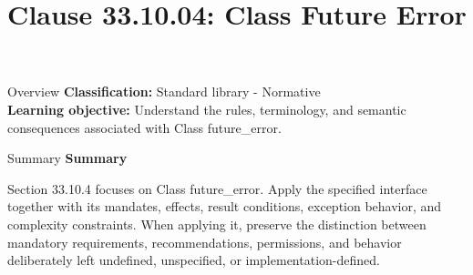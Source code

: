 \documentclass[10pt,letterpaper]{article}
\title{Clause 33.10.04: Class Future Error}
\author{}
\date{}
\begin{document}
\maketitle
\begin{CornellOverviewBox}{Overview}
\textbf{Classification:} Standard library - Normative\\[2pt]
\textbf{Learning objective:} Understand the rules, terminology, and semantic consequences associated with Class future\_error.
\end{CornellOverviewBox}\begin{CornellSummaryBox}{Summary}
{\sffamily\bfseries\color{Accent} Summary}\par\vspace{3pt}Section 33.10.4 focuses on Class future\_error. Apply the specified interface together with its mandates, effects, result conditions, exception behavior, and complexity constraints. When applying it, preserve the distinction between mandatory requirements, recommendations, permissions, and behavior deliberately left undefined, unspecified, or implementation-defined.
\end{CornellSummaryBox}
\end{document}
